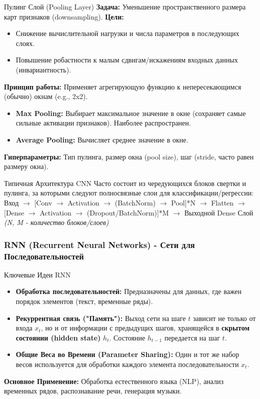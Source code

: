 \begin{myexampleblock}{Пулинг Слой (Pooling Layer)}
    \textbf{Задача:} Уменьшение пространственного размера карт признаков (downsampling).
    \textbf{Цели:}
    \begin{itemize}[nosep, leftmargin=*]
        \item Снижение вычислительной нагрузки и числа параметров в последующих слоях.
        \item Повышение робастности к малым сдвигам/искажениям входных данных (инвариантность).
    \end{itemize}
    \textbf{Принцип работы:} Применяет агрегирующую функцию к непересекающимся (обычно) окнам (e.g., 2x2).
    \begin{itemize}[nosep, leftmargin=*]
        \item \textbf{Max Pooling:} Выбирает максимальное значение в окне (сохраняет самые сильные активации признаков). Наиболее распространен.
        \item \textbf{Average Pooling:} Вычисляет среднее значение в окне.
    \end{itemize}
    \textbf{Гиперпараметры:} Тип пулинга, размер окна (pool size), шаг (stride, часто равен размеру окна).
\end{myexampleblock}

\begin{myblock}{Типичная Архитектура CNN}
    Часто состоит из чередующихся блоков свертки и пулинга, за которыми следуют полносвязные слои для классификации/регрессии:
    Вход $\rightarrow$ [Conv $\rightarrow$ Activation $\rightarrow$ (BatchNorm) $\rightarrow$ Pool]*N $\rightarrow$ Flatten $\rightarrow$ [Dense $\rightarrow$ Activation $\rightarrow$ (Dropout/BatchNorm)]*M $\rightarrow$ Выходной Dense Слой
    \textit{(N, M - количество блоков/слоев)}
\end{myblock}

\subsubsection{RNN (Recurrent Neural Networks) - Сети для Последовательностей}
\begin{myblock}{Ключевые Идеи RNN}
    \begin{itemize}[nosep, leftmargin=*]
        \item \textbf{Обработка последовательностей:} Предназначены для данных, где важен порядок элементов (текст, временные ряды).
        \item \textbf{Рекуррентная связь ("Память"):} Выход сети на шаге $t$ зависит не только от входа $x_t$, но и от информации с предыдущих шагов, хранящейся в \textbf{скрытом состоянии (hidden state)} $h_t$. Состояние $h_{t-1}$ передается на шаг $t$.
        \item \textbf{Общие Веса во Времени (Parameter Sharing):} Один и тот же набор весов используется для обработки каждого элемента последовательности $x_t$.
    \end{itemize}
    \textbf{Основное Применение:} Обработка естественного языка (NLP), анализ временных рядов, распознавание речи, генерация музыки.
\end{myblock}

